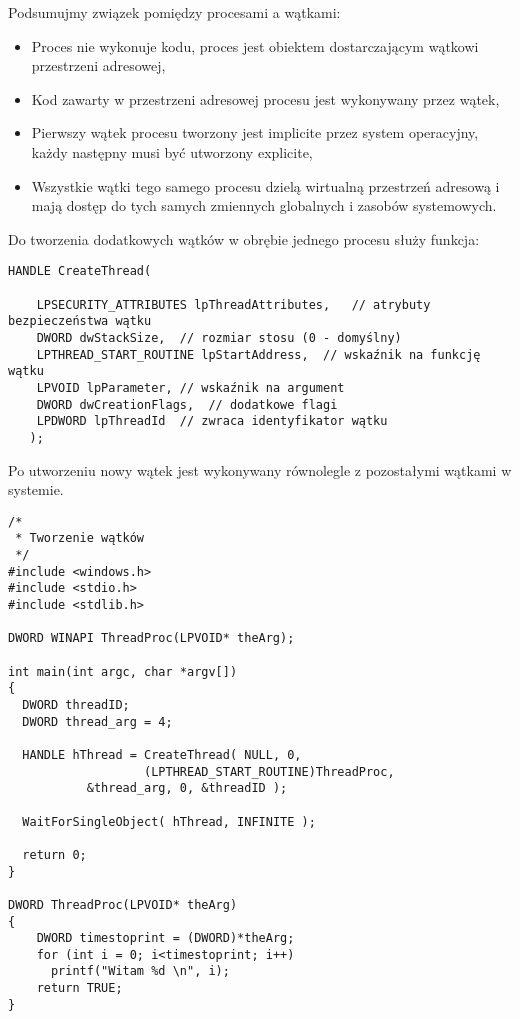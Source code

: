 Podsumujmy związek pomiędzy procesami a wątkami:  
\begin{itemize}
  \item Proces nie wykonuje kodu, proces jest obiektem dostarczającym wątkowi przestrzeni adresowej,   
  \item Kod zawarty w przestrzeni adresowej procesu jest wykonywany przez wątek,   
  \item Pierwszy wątek procesu tworzony jest implicite przez system operacyjny, 
        każdy następny musi być utworzony explicite,   
  \item Wszystkie wątki tego samego procesu dzielą wirtualną przestrzeń adresową i 
        mają dostęp do tych samych zmiennych globalnych i zasobów systemowych.  
\end{itemize}
   
Do tworzenia dodatkowych wątków w obrębie jednego procesu służy funkcja:

\begin{scriptsize}
\begin{verbatim}
HANDLE CreateThread(

    LPSECURITY_ATTRIBUTES lpThreadAttributes,	// atrybuty bezpieczeństwa wątku
    DWORD dwStackSize,	// rozmiar stosu (0 - domyślny)
    LPTHREAD_START_ROUTINE lpStartAddress,	// wskaźnik na funkcję wątku
    LPVOID lpParameter,	// wskaźnik na argument
    DWORD dwCreationFlags,	// dodatkowe flagi 
    LPDWORD lpThreadId 	// zwraca identyfikator wątku
   );
\end{verbatim}
\end{scriptsize}

Po utworzeniu nowy wątek jest wykonywany równolegle z pozostałymi wątkami w systemie. 

\begin{scriptsize}
\begin{verbatim}
/* 
 * Tworzenie wątków
 */
#include <windows.h>
#include <stdio.h>
#include <stdlib.h>
  
DWORD WINAPI ThreadProc(LPVOID* theArg);  
   
int main(int argc, char *argv[])  
{  
  DWORD threadID;  
  DWORD thread_arg = 4;  
   
  HANDLE hThread = CreateThread( NULL, 0, 
                   (LPTHREAD_START_ROUTINE)ThreadProc, 
		   &thread_arg, 0, &threadID );  

  WaitForSingleObject( hThread, INFINITE );                                   
   
  return 0;  
}  

DWORD ThreadProc(LPVOID* theArg)  
{  
    DWORD timestoprint = (DWORD)*theArg;  
    for (int i = 0; i<timestoprint; i++)  
      printf("Witam %d \n", i);  
    return TRUE;   
}  
\end{verbatim}
\end{scriptsize}
  
